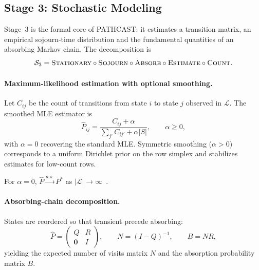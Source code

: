 \subsection{Stage 3: Stochastic Modeling}
\label{sec:stages-s3}

Stage~3 is the formal core of PATHCAST: it estimates a transition
matrix, an empirical sojourn-time distribution and the fundamental
quantities of an absorbing Markov chain. The decomposition is
\begin{equation}
\label{eq:s3-decomposition}
\mathcal{S}_3 = \textsc{Stationary} \circ \textsc{Sojourn} \circ
    \textsc{Absorb} \circ \textsc{Estimate} \circ \textsc{Count}.
\end{equation}

\paragraph{Maximum-likelihood estimation with optional smoothing.}
Let $C_{ij}$ be the count of transitions from state $i$ to state $j$
observed in $\mathcal{L}$. The smoothed MLE estimator is
\begin{equation}
\label{eq:mle-full}
\hat{P}_{ij} = \frac{C_{ij} + \alpha}
                    {\sum_{j'} C_{ij'} + \alpha |S|}, \qquad
\alpha \geq 0,
\end{equation}
with $\alpha = 0$ recovering the standard MLE. Symmetric smoothing
($\alpha > 0$) corresponds to a uniform Dirichlet prior on the row
simplex and stabilizes estimates for low-count rows.

\begin{property}
\label{prop:mle-consistency}
For $\alpha = 0$, $\hat{P} \xrightarrow{a.s.} P^{*}$ as
$|\mathcal{L}| \to \infty$~\cite{Spedicato2017}.
\end{property}

\paragraph{Absorbing-chain decomposition.}
States are reordered so that transient precede absorbing:
\begin{equation}
\label{eq:absorbing-decomposition}
\hat{P} = \begin{pmatrix} Q & R \\ \mathbf{0} & I \end{pmatrix},
\qquad
N = (I-Q)^{-1}, \qquad
B = NR,
\end{equation}
yielding the expected number of visits matrix $N$ and the absorption
probability matrix $B$.

